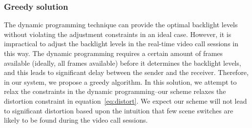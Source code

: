 

\subsubsection{Greedy solution}
\label{sec:greedy}
The dynamic programming technique can provide the optimal
backlight levels without violating the adjustment constraints in an
ideal case. However, 
it is impractical to adjust the backlight levels in the real-time
video call sessions in
this way. The dynamic programming requires a certain amount of frames
available (ideally, all frames available) before
it determines the backlight levels, and this leads to significant
delay between the sender and the receiver. 
Therefore, in our system, we propose a greedy algorithm. In this solution,
we attempt to relax the constraints in the dynamic
programming--our scheme relaxes the distortion constraint in
equation~\ref{eq:distort}. We expect our scheme will not lead to significant
 distortion based upon the intuition that few scene switches are
likely to be found during the video call sessions. 


